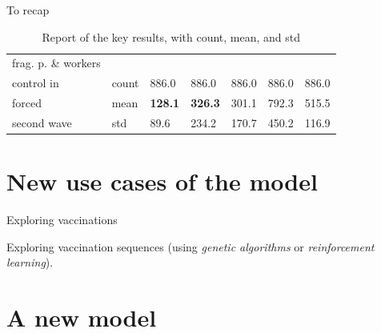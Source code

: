 \documentclass[8pt]{beamer}
\begin{document}
\begin{frame}{To recap}
\begin{table}[H]
\begin{tabular}{p{1.8cm}p{0.5cm}p{0.5cm}p{0.5cm}p{0.5cm}p{0.5cm}p{0.5cm}}
\midrule
frag. p. \& workers \\  
control in              & count &   886.0 &                      886.0 &              886.0 &                   886.0 &  886.0 \\
forced                  & mean  &  \textbf{{\color{cyan}128.1}} &         \textbf{{\color{cyan}326.3}} &          301.1 &        792.3 &  515.5 \\
second wave       & std   &  89.6 &        234.2 &   170.7 &          450.2 &  116.9 \\


\bottomrule
\end{tabular}
\caption{Report of the key results, with count, mean, and std}
\label{keyResultsT}
\end{table}



\end{frame}

\section{New use cases of the model}

\begin{frame}{Exploring vaccinations}

Exploring vaccination sequences (using \emph{genetic algorithms} or \emph{reinforcement learning}).

\end{frame}


\section{A new model}
\end{document}
